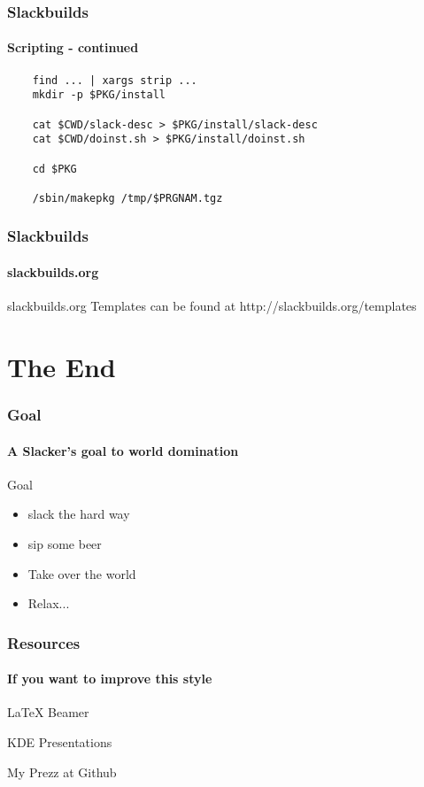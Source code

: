 \documentclass[12pt,hyperref={pdfpagelabels=true}]{beamer}
\begin{document}
\begin{frame}[fragile]
  \frametitle{Slackbuilds}
  \framesubtitle{Scripting - continued}

  \begin{lstlisting}
    find ... | xargs strip ...
    mkdir -p $PKG/install
    
    cat $CWD/slack-desc > $PKG/install/slack-desc
    cat $CWD/doinst.sh > $PKG/install/doinst.sh
    
    cd $PKG
    
    /sbin/makepkg /tmp/$PRGNAM.tgz
  \end{lstlisting}
\end{frame}

\begin{frame}
  \frametitle{Slackbuilds}
  \framesubtitle{slackbuilds.org}
    \begin{block}{slackbuilds.org}
      Templates can be found at
      http://slackbuilds.org/templates
    \end{block}
\end{frame}

\section{The End}

\begin{frame}
  \frametitle{Goal}
  \framesubtitle{A Slacker's goal to world domination}
  \begin{block}{Goal}
    \begin{itemize}[<+-| alert@+>]
    \item slack the hard way
    \item sip some beer
    \item Take over the world
    \item Relax...
    \end{itemize}
  \end{block}
\end{frame}

\begin{frame}
  \frametitle{Resources}
  \framesubtitle{If you want to improve this style}
  \begin{thebibliography}{10}
    \beamertemplatearticlebibitems

    LaTeX Beamer

    KDE Presentations

    My Prezz at Github

  \end{thebibliography}
\end{frame}

\end{document}

